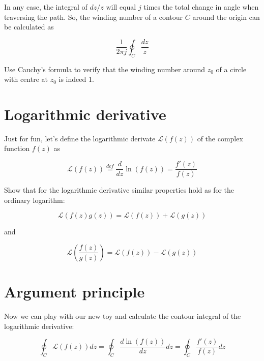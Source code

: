 In any case, the integral of $dz/z$ will equal $j$ times the total change in angle when traversing the path. So, the winding number of a contour $C$ around the origin can be calculated as

\begin{equation}
\frac{1}{2 \pi j} \oint_C \frac{dz}{z}   
\end{equation}

\begin{exer}
Use Cauchy's formula to verify that the winding number around $z_0$ of a circle with centre at $z_0$ is indeed 1.
\end{exer}


\pagebreak

\section{Logarithmic derivative}

Just for fun, let's define the logarithmic derivate $\mathcal{L}(f(z))$ of the complex function $f(z)$ as

\begin{equation}
    \mathcal{L}(f(z)) \stackrel{def}{=} \frac{d}{dz}\ln\left(f(z)\right) = \frac{f'(z)}{f(z)}
\end{equation}

\begin{exer}
Show that for the logarithmic derivative similar properties hold as for the ordinary logarithm:

$$\mathcal{L}(f(z)g(z)) = \mathcal{L}(f(z)) + \mathcal{L}(g(z))$$

and

$$\mathcal{L}\left(\frac{f(z)}{g(z)}\right) = \mathcal{L}\left(f(z)\right) - \mathcal{L}(g(z))$$

\end{exer}

\pagebreak

\section{Argument principle}

Now we can play with our new toy and calculate the contour integral of the logarithmic derivative:

\begin{equation}
\oint_C \mathcal{L}(f(z)) dz = \oint_C \frac {d \ln\left(f(z)\right)} {dz} dz = \oint_C \frac{f'(z)}{f(z)} dz 
\end{equation}

